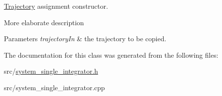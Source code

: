 \hyperlink{class_single_integrator_1_1_trajectory}{Trajectory} assignment constructor. 

More elaborate description


\begin{DoxyParams}{Parameters}
{\em trajectory\-In} & the trajectory to be copied. \\
\hline
\end{DoxyParams}


The documentation for this class was generated from the following files\-:\begin{DoxyCompactItemize}
\item 
src/\hyperlink{system__single__integrator_8h}{system\-\_\-single\-\_\-integrator.\-h}\item 
src/system\-\_\-single\-\_\-integrator.\-cpp\end{DoxyCompactItemize}
